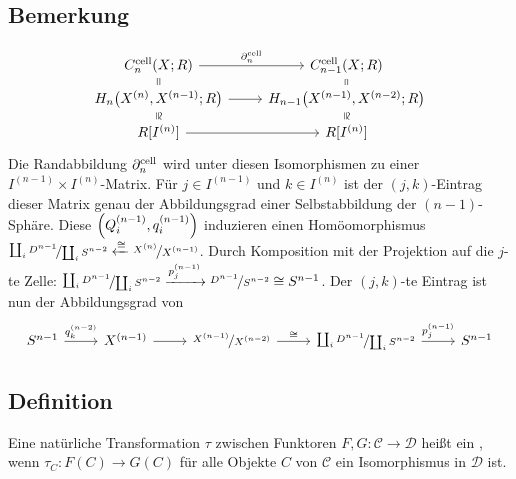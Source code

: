 \subsection{Bemerkung} %
\label{sub:126}
\[
	\begin{tikzcd}[row sep=tiny]
		C_n^{\cell}(X;R) \dar[equal] \rar["\partial_n^{\cell}"] & C_{n-1}^{\cell}(X;R) \dar[equal]\\
		H_n \enbrace*{X^{(n)},X^{(n-1)};R} \rar \arrow[draw=none]{d}[sloped,auto=false]{\cong}
		& H_{n-1} \enbrace*{X^{(n-1)},X^{(n-2)};R} \arrow[draw=none]{d}[sloped,auto=false]{\cong}\\
		R[I^{(n)}] \rar & R[I^{(n)}]  
	\end{tikzcd}
\]
Die Randabbildung $\partial_n^{\cell}$ wird unter diesen Isomorphismen zu einer $I^{(n-1)} \times I^{(n)}$-Matrix. Für $j \in I^{(n-1)}$ und $k \in I^{(n)}$ ist der 
$(j,k)$-Eintrag dieser Matrix genau der Abbildungsgrad einer Selbstabbildung der $(n-1)$-Sphäre. Diese $\enbrace*{Q_i^{(n-1)}, q_i^{(n-1)}}$ induzieren einen Homöomorphismus
$\nicefrac{\coprod_i D^{n-1}}{\coprod_i S^{n-2}} \xleftarrow{\cong} \nicefrac{X^{(n)}}{X^{(n-1)}}$. Durch Komposition mit der Projektion auf die $j$-te Zelle: 
$\nicefrac{\coprod_i D^{n-1}}{\coprod_i S^{n-2}} \xrightarrow{p_j^{(n-1)}}  \nicefrac{D^{n-1}}{S^{n-2}} \cong S^{n-1}$. Der $(j,k)$-te Eintrag ist nun der 
Abbildungsgrad von 
\[
	\begin{tikzcd}
		S^{n-1} \rar["q^{(n-2)}_k"] & X^{(n-1)} \rar & \nicefrac{X^{(n-1)}}{X^{(n-2)}} \rar["\cong"] & \nicefrac{\coprod_i D^{n-1}}{\coprod_i S^{n-2}} \rar["p_j^{(n-1)}"]
		& S^{n-1}
	\end{tikzcd}
\]

\subsection[Definition: Natürlicher Isomorphismus]{Definition} %
\label{sub:127}
Eine natürliche Transformation $\tau$ zwischen Funktoren $F,G\colon \mathcal{C} \to \mathcal{D}$ heißt ein , wenn 
$\tau_C \colon F(C) \to G(C)$ für alle Objekte $C$ von $\mathcal{C}$ ein Isomorphismus in $\mathcal{D}$ ist.

